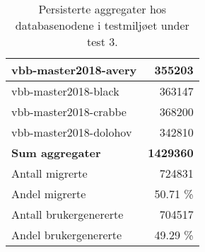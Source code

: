 \begin{table}[hbtp]
  \caption{Persisterte aggregater hos databasenodene i testmiljøet under test 3.}
  \begin{center}
    \begin{tabular}{ | l | r |}
      \hline
      vbb-master2018-avery & 355203 \\ \hline
      vbb-master2018-black & 363147 \\ \hline
      vbb-master2018-crabbe & 368200 \\ \hline
      vbb-master2018-dolohov & 342810 \\ \hline
      \textbf{Sum aggregater} & \textbf{1429360} \\ \hline
      Antall migrerte & 724831 \\ \hline
      Andel migrerte & 50.71 \% \\ \hline
      Antall brukergenererte & 704517 \\ \hline
      Andel brukergenererte & 49.29 \% \\ \hline
    \end{tabular}
  \end{center}
  \label{backend3}
\end{table}
